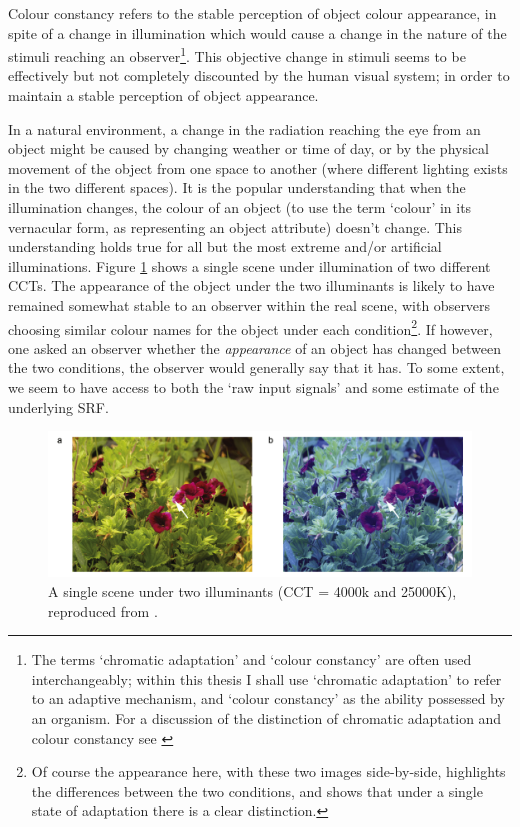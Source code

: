 Colour constancy refers to the stable perception of object colour appearance, in spite of a change in illumination which would cause a change in the nature of the stimuli reaching an observer\footnote{The terms `chromatic adaptation' and `colour constancy' are often used interchangeably; within this thesis I shall use `chromatic adaptation' to refer to an adaptive mechanism, and `colour constancy' as the ability possessed by an organism. For a discussion of the distinction of chromatic adaptation and colour constancy see \citet{brill_chromatic_1986}}. This objective change in stimuli seems to be effectively but not completely discounted by the human visual system; in order to maintain a stable perception of object appearance. 

In a natural environment, a change in the radiation reaching the eye from an object might be caused by changing weather or time of day, or by the physical movement of the object from one space to another (where different lighting exists in the two different spaces). It is the popular understanding that when the illumination changes, the colour of an object (to use the term `colour' in its vernacular form, as representing an object attribute) doesn't change. This understanding holds true for all but the most extreme and/or artificial illuminations. Figure \ref{fig:fosterflowers} shows a single scene under illumination of two different \glspl{CCT}. The appearance of the object under the two illuminants is likely to have remained somewhat stable to an observer within the real scene, with observers choosing similar colour names for the object under each condition\footnote{Of course the appearance here, with these two images side-by-side, highlights the differences between the two conditions, and shows that under a single state of adaptation there is a clear distinction.}. If however, one asked an observer whether the \emph{appearance} of an object has changed between the two conditions, the observer would generally say that it has. To some extent, we seem to have access to both the `raw input signals' and some estimate of the underlying \gls{SRF}.

\begin{figure}[htbp]
\includegraphics[max width=\textwidth]{figs/LitRev/fosterflowers.png}
\caption{A single scene under two illuminants (\Gls{CCT} = 4000k and 25000K), reproduced from \citet{foster_color_2011}.}
\label{fig:fosterflowers}
\end{figure}

